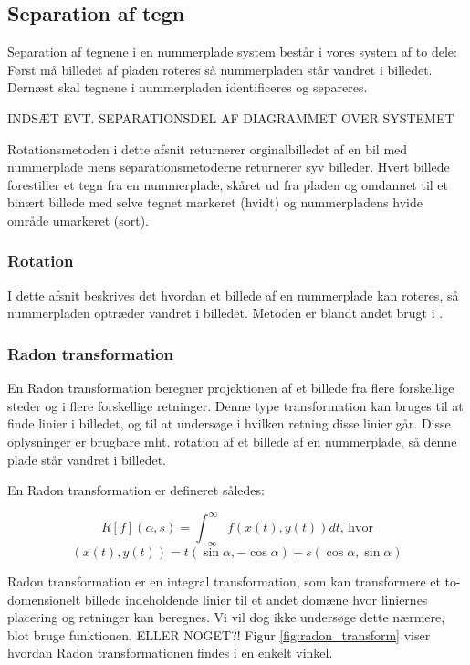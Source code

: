 \subsection{Separation af tegn}

Separation af tegnene i en nummerplade system består i vores system af to dele: Først må billedet af pladen roteres så nummerpladen står vandret i billedet. Dernæst skal tegnene i nummerpladen identificeres og separeres.

INDSÆT EVT. SEPARATIONSDEL AF DIAGRAMMET OVER SYSTEMET

Rotationsmetoden i dette afsnit returnerer orginalbilledet af en bil med nummerplade mens separationsmetoderne returnerer syv billeder. Hvert billede forestiller et tegn fra en nummerplade, skåret ud fra pladen og omdannet til et binært billede med selve tegnet markeret (hvidt) og nummerpladens hvide område umarkeret (sort).

\subsubsection{Rotation}

I dette afsnit beskrives det hvordan et billede af en nummerplade kan roteres, så nummerpladen optræder vandret i billedet. Metoden er blandt andet brugt i \cite{shapiro}.

\subsubsection*{Radon transformation}
En Radon transformation beregner projektionen af et billede fra flere forskellige steder og i flere forskellige retninger\cite{matlab_radon}. Denne type transformation kan bruges til at finde linier i billedet, og til at undersøge i hvilken retning disse linier går. Disse oplysninger er brugbare mht. rotation af et billede af en nummerplade, så denne plade står vandret i billedet.

En Radon transformation er defineret således\cite{wiki_radon}:

\begin{displaymath}
		R[f](\alpha,s) = \int_{-\infty}^{\infty}f(x(t),y(t))dt \text{, hvor}
\end{displaymath}
\begin{displaymath}
		(x(t),y(t)) = t(\sin\alpha, -\cos\alpha)+s(\cos\alpha,\sin\alpha)
\end{displaymath}

Radon transformation er en integral transformation, som kan transformere et to-domensionelt billede indeholdende linier til et andet domæne hvor liniernes placering og retninger kan beregnes\cite{toft_radon}. Vi vil dog ikke undersøge dette nærmere, blot bruge funktionen. ELLER NOGET?! Figur \vref{fig:radon_transform} viser hvordan Radon transformationen findes i en enkelt vinkel.

